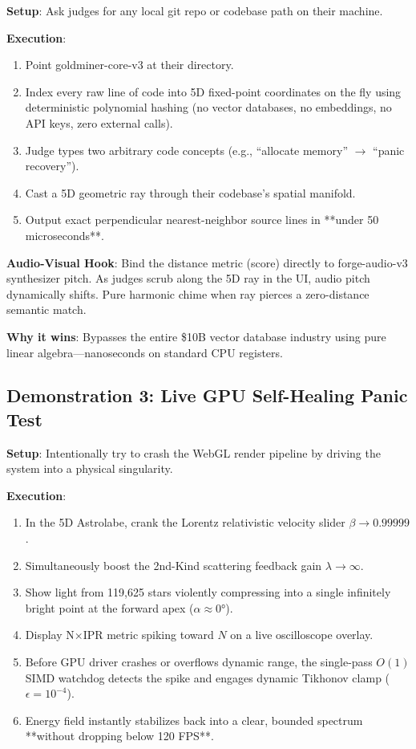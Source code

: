 \documentclass[11pt,oneside]{article}
\theoremstyle{definition}
\begin{document}
\textbf{Setup}: Ask judges for any local git repo or codebase path on their machine.

\textbf{Execution}:
\begin{enumerate}
  \item Point goldminer-core-v3 at their directory.
  \item Index every raw line of code into 5D fixed-point coordinates on the fly using deterministic polynomial hashing (no vector databases, no embeddings, no API keys, zero external calls).
  \item Judge types two arbitrary code concepts (e.g., ``allocate memory'' $\to$ ``panic recovery'').
  \item Cast a 5D geometric ray through their codebase's spatial manifold.
  \item Output exact perpendicular nearest-neighbor source lines in **under 50 microseconds**.
\end{enumerate}

\textbf{Audio-Visual Hook}: Bind the distance metric (score) directly to forge-audio-v3 synthesizer pitch. As judges scrub along the 5D ray in the UI, audio pitch dynamically shifts. Pure harmonic chime when ray pierces a zero-distance semantic match.

\textbf{Why it wins}: Bypasses the entire \$10B vector database industry using pure linear algebra—nanoseconds on standard CPU registers.

\subsection{Demonstration 3: Live GPU Self-Healing Panic Test}

\textbf{Setup}: Intentionally try to crash the WebGL render pipeline by driving the system into a physical singularity.

\textbf{Execution}:
\begin{enumerate}
  \item In the 5D Astrolabe, crank the Lorentz relativistic velocity slider $\beta \to 0.99999$.
  \item Simultaneously boost the 2nd-Kind scattering feedback gain $\lambda \to \infty$.
  \item Show light from 119,625 stars violently compressing into a single infinitely bright point at the forward apex ($\alpha \approx 0°$).
  \item Display N×IPR metric spiking toward $N$ on a live oscilloscope overlay.
  \item Before GPU driver crashes or overflows dynamic range, the single-pass $O(1)$ SIMD watchdog detects the spike and engages dynamic Tikhonov clamp ($\epsilon = 10^{-4}$).
  \item Energy field instantly stabilizes back into a clear, bounded spectrum **without dropping below 120 FPS**.
\end{enumerate}
\end{document}
